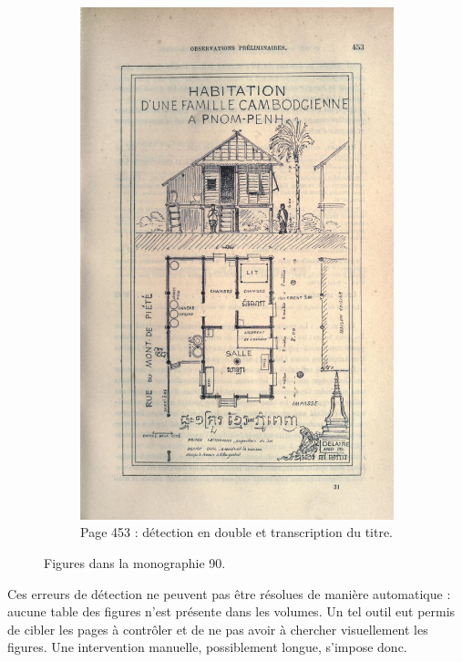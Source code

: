 \begin{figure}
\begin{subfigure}{0.4\textwidth}
     \includegraphics[width=1\linewidth]{img/odm90_453.jpg}
     \caption{Page 453 : détection en double et transcription du titre.}
     \label{fig:odmfig90453}
    \end{subfigure}
    \caption{Figures dans la monographie \no{}90.}
    \label{fig:odmfig90}
\end{figure}

Ces erreurs de détection ne peuvent pas être résolues de manière automatique : aucune table des figures n'est présente dans les volumes. Un tel outil eut permis de cibler les pages à contrôler et de ne pas avoir à chercher visuellement les figures. Une intervention manuelle, possiblement longue, s'impose donc.


